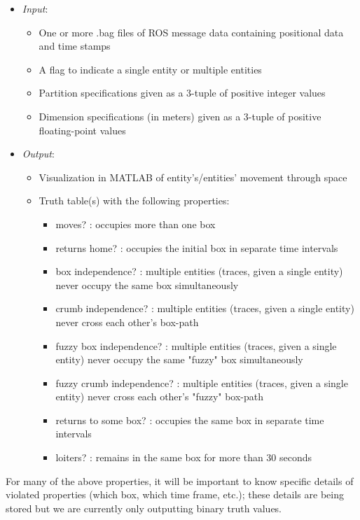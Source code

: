  \begin{itemize}
  \item \emph{Input}: 
   \begin{itemize}
    \item One or more .bag files of ROS message data containing positional data and time stamps
    \item A flag to indicate a single entity or multiple entities
    \item Partition specifications given as a 3-tuple of positive integer values
    \item Dimension specifications (in meters) given as a 3-tuple of positive floating-point values
   \end{itemize}

  \item \emph{Output}:
   \begin{itemize}
    \item Visualization in MATLAB of entity's/entities' movement through space
    \item Truth table(s) with the following properties:
      \begin{itemize}
       \item moves? : occupies more than one box
       \item returns home? : occupies the initial box in separate time intervals
       \item box independence? : multiple entities (traces, given a single entity) never occupy the same box simultaneously
       \item crumb independence? : multiple entities (traces, given a single entity) never cross each other's box-path
       \item fuzzy box independence? : multiple entities (traces, given a single entity) never occupy the same "fuzzy" box simultaneously
       \item fuzzy crumb independence? : multiple entities (traces, given a single entity) never cross each other's "fuzzy" box-path
       \item returns to some box? : occupies the same box in separate time intervals
       \item loiters? : remains in the same box for more than 30 seconds
      \end{itemize}

   \end{itemize} 
 \end{itemize}
 
 For many of the above properties, it will be important to know specific details of violated properties (which box, which time frame, etc.); these details are being stored but we are currently only outputting binary truth values. 
 
